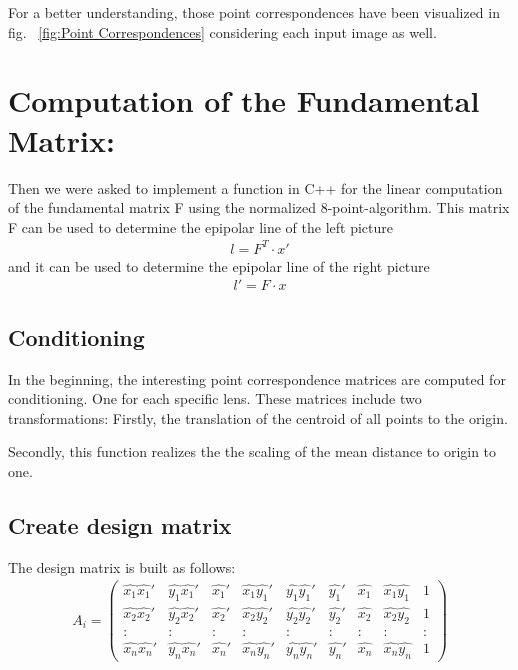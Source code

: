 \documentclass[a4paper,headings=small]{scrartcl}
\numberwithin{equation}{section} %
\numberwithin{figure}{section}   %
\begin{document}
For a better understanding, those point correspondences have been 
visualized in fig. ~\ref{fig:Point Correspondences}
considering each input image as well.

\section{Computation of the Fundamental Matrix:}

Then we were asked to implement a function in C++ for the linear computation of the fundamental
matrix F using the normalized 8-point-algorithm.
This matrix F can be used to determine the epipolar line of the left picture
   \begin{align}
       l = F^T \cdot x'
   \end{align}
and it can be used to determine the epipolar line of the right picture
   \begin{align}
       l' = F \cdot x
   \end{align}

  \subsection{Conditioning}

  In the beginning, the interesting point correspondence matrices are computed for conditioning.
  One for each specific lens.
  These matrices include two transformations: 
  Firstly, the translation of the centroid of all points to the origin.

  Secondly, this function realizes the the scaling of the mean distance to origin to one.

  \subsection{Create design matrix}

  The design matrix is built as follows: \\
  \begin{align}
  A_{i}=
  \left( \begin{array}{ccccccccc}
  \hat{x_1}\hat{x_1}' & \hat{y_1}\hat{x_1}' & \hat{x_1}' & \hat{x_1}\hat{y_1}' & \hat{y_1}\hat{y_1}' & \hat{y_1}' & \hat{x_1} & \hat{x_1}\hat{y_1} & 1\\
  \hat{x_2}\hat{x_2}' & \hat{y_2}\hat{x_2}' & \hat{x_2}' & \hat{x_2}\hat{y_2}' & \hat{y_2}\hat{y_2}' & \hat{y_2}' & \hat{x_2} & \hat{x_2}\hat{y_2} & 1\\
   : & : & : & : & : & : & : & : & : \\
  \hat{x_n}\hat{x_n}' & \hat{y_n}\hat{x_n}' & \hat{x_n}' & \hat{x_n}\hat{y_n}' & \hat{y_n}\hat{y_n}' & \hat{y_n}' & \hat{x_n} & \hat{x_n}\hat{y_n} & 1
  \end{array} \right) 
  \end{align}
\end{document}
